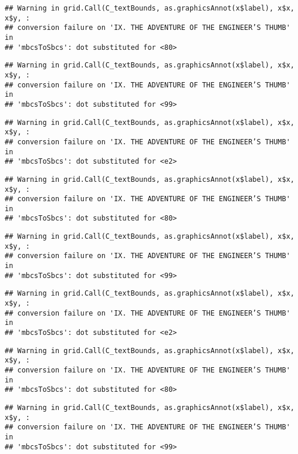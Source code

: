 \documentclass[
]{book}
\begin{document}
\begin{verbatim}
## Warning in grid.Call(C_textBounds, as.graphicsAnnot(x$label), x$x, x$y, :
## conversion failure on 'IX. THE ADVENTURE OF THE ENGINEER’S THUMB' in
## 'mbcsToSbcs': dot substituted for <80>
\end{verbatim}

\begin{verbatim}
## Warning in grid.Call(C_textBounds, as.graphicsAnnot(x$label), x$x, x$y, :
## conversion failure on 'IX. THE ADVENTURE OF THE ENGINEER’S THUMB' in
## 'mbcsToSbcs': dot substituted for <99>
\end{verbatim}

\begin{verbatim}
## Warning in grid.Call(C_textBounds, as.graphicsAnnot(x$label), x$x, x$y, :
## conversion failure on 'IX. THE ADVENTURE OF THE ENGINEER’S THUMB' in
## 'mbcsToSbcs': dot substituted for <e2>
\end{verbatim}

\begin{verbatim}
## Warning in grid.Call(C_textBounds, as.graphicsAnnot(x$label), x$x, x$y, :
## conversion failure on 'IX. THE ADVENTURE OF THE ENGINEER’S THUMB' in
## 'mbcsToSbcs': dot substituted for <80>
\end{verbatim}

\begin{verbatim}
## Warning in grid.Call(C_textBounds, as.graphicsAnnot(x$label), x$x, x$y, :
## conversion failure on 'IX. THE ADVENTURE OF THE ENGINEER’S THUMB' in
## 'mbcsToSbcs': dot substituted for <99>
\end{verbatim}

\begin{verbatim}
## Warning in grid.Call(C_textBounds, as.graphicsAnnot(x$label), x$x, x$y, :
## conversion failure on 'IX. THE ADVENTURE OF THE ENGINEER’S THUMB' in
## 'mbcsToSbcs': dot substituted for <e2>
\end{verbatim}

\begin{verbatim}
## Warning in grid.Call(C_textBounds, as.graphicsAnnot(x$label), x$x, x$y, :
## conversion failure on 'IX. THE ADVENTURE OF THE ENGINEER’S THUMB' in
## 'mbcsToSbcs': dot substituted for <80>
\end{verbatim}

\begin{verbatim}
## Warning in grid.Call(C_textBounds, as.graphicsAnnot(x$label), x$x, x$y, :
## conversion failure on 'IX. THE ADVENTURE OF THE ENGINEER’S THUMB' in
## 'mbcsToSbcs': dot substituted for <99>
\end{verbatim}
\end{document}
